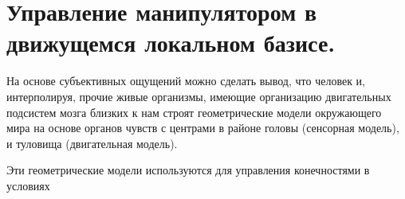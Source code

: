 \section{Управление манипулятором в движущемся локальном базисе.}

На основе субъективных ощущений можно сделать вывод, что человек и, интерполируя, прочие живые организмы, имеющие организацию двигательных подсистем мозга близких к нам строят геометрические модели окружающего мира на основе органов чувств с центрами в районе головы (сенсорная модель), и туловища (двигательная модель).

Эти геометрические модели используются для управления конечностями в условиях